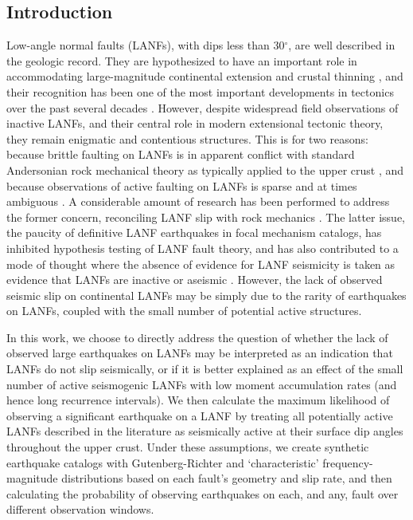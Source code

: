 \documentclass[twocolumn,grl]{AGUTeX}
\begin{document}
\begin{article}

\section{Introduction}
Low-angle normal faults (LANFs), with dips less than 30$^\circ$, are
well described in the geologic record. They are hypothesized to have
an important role in accommodating large-magnitude continental
extension \citep{howard1987crustal} and crustal thinning
\citep{lister1986detachment}, and their recognition has been one of
the most important developments in tectonics over the past several
decades \citep{wernicke2009detachment}. However, despite widespread
field observations of inactive LANFs, and their central role in modern
extensional tectonic theory, they remain enigmatic and contentious
structures. This is for two reasons: because brittle faulting on LANFs
is in apparent conflict with standard Andersonian rock mechanical
theory as typically applied to the upper crust
\citep{axen2004lanfmech}, and because observations of active faulting
on LANFs is sparse and at times ambiguous \citep{wernicke1995seis}. A
considerable amount of research has been performed to address the
former concern, reconciling LANF slip with rock mechanics \citep [e.g.]
[]{collettini2011lanfmech}. The latter issue, the paucity of definitive LANF
earthquakes in focal mechanism catalogs, has inhibited hypothesis testing of 
LANF fault theory, and has also contributed to a mode of thought where the 
absence of evidence for LANF seismicity is taken as evidence that LANFs
are inactive or aseismic \citep{jackson1987,
  collettinisibson2001}. However, the lack of observed seismic slip on
continental LANFs may be simply due to the rarity of earthquakes on
LANFs, coupled with the small number of potential active structures.

In this work, we choose to directly address the question of whether
the lack of observed large earthquakes on LANFs may be 
interpreted as an indication that
LANFs do not slip seismically, or if it is better explained as an
effect of the small number of active seismogenic LANFs with low moment
accumulation rates (and hence long recurrence intervals). 
We then calculate the maximum likelihood of observing a significant
earthquake on a LANF by treating all potentially active LANFs described in the 
literature as seismically active at their surface dip angles 
throughout the upper crust. %
Under these assumptions, we create synthetic earthquake catalogs with
Gutenberg-Richter and `characteristic' frequency-magnitude distributions
based on each fault's geometry and slip rate, and then calculating the
probability of observing earthquakes on each, and any, fault over different
observation windows.


\end{article}
\end{document}
